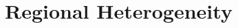 \documentclass[9pt,aspectratio=169]{beamer}
\begin{document}

% 

% 

% 


\section{Regional Heterogeneity}
\end{document}
